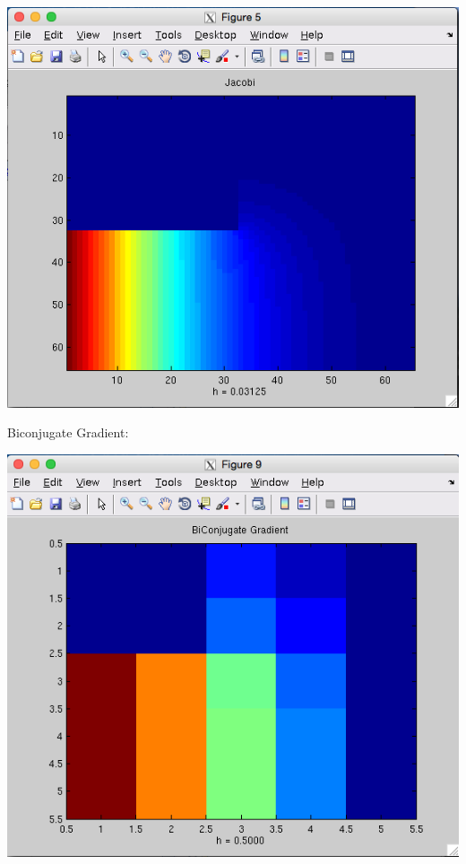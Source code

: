 \documentclass[11pt, oneside]{article}   	%
\begin{document}
\centerline{\includegraphics[scale = 0.55]{Jacobi_h5.png}}

Biconjugate Gradient: \\

\centerline{\includegraphics[scale = 0.55]{Biconjugate_h1.png}}
\end{document}
